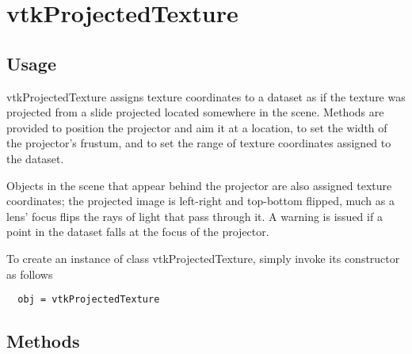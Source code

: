 \section{vtkProjectedTexture}

\subsection{Usage}

 vtkProjectedTexture assigns texture coordinates to a dataset as if
 the texture was projected from a slide projected located somewhere in the
 scene.  Methods are provided to position the projector and aim it at a 
 location, to set the width of the projector's frustum, and to set the
 range of texture coordinates assigned to the dataset.  

 Objects in the scene that appear behind the projector are also assigned
 texture coordinates; the projected image is left-right and top-bottom 
 flipped, much as a lens' focus flips the rays of light that pass through
 it.  A warning is issued if a point in the dataset falls at the focus
 of the projector.

To create an instance of class vtkProjectedTexture, simply
invoke its constructor as follows
\begin{verbatim}
  obj = vtkProjectedTexture
\end{verbatim}
\subsection{Methods}

